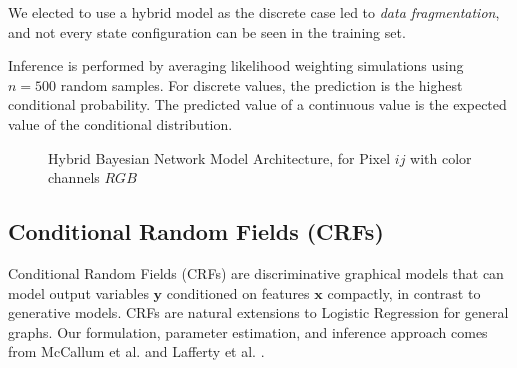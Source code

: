 \documentclass{article}
\begin{document}
We elected to use a hybrid model as the discrete case led to
\textit{data fragmentation}, and not every state configuration can be seen
in the training set.

Inference is performed by averaging likelihood weighting simulations using
$n=500$ random samples. For discrete values, the prediction is the highest
conditional probability. The predicted value of a continuous value is the
expected value of the conditional distribution.

\begin{figure}
  \centering
  \caption{Hybrid Bayesian Network Model Architecture, for Pixel $ij$ with color channels $RGB$}
  \label{fig:net-structure}
\end{figure}

\subsection{Conditional Random Fields (CRFs)}
\label{sec:CRF}
Conditional Random Fields (CRFs) are discriminative graphical models that
can model output variables $\mathbf{y}$ conditioned on features $\mathbf{x}$
compactly, in contrast to generative models. CRFs are natural extensions
to Logistic Regression for general graphs. Our formulation,
parameter estimation, and inference approach comes from McCallum et al. \cite{McCallumCRF}
and Lafferty et al. \cite{CRF}.
\end{document}
